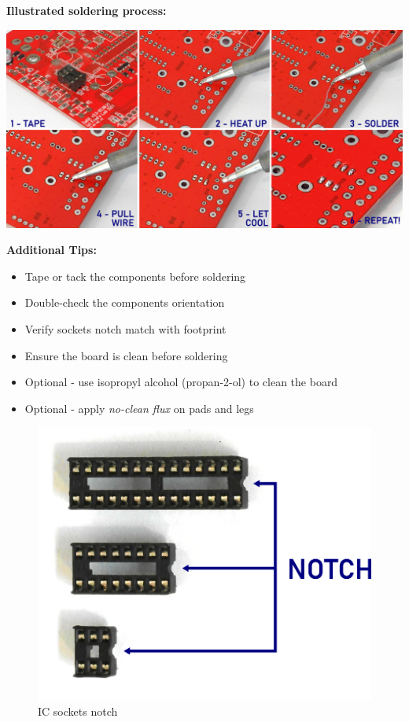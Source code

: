\documentclass{scrartcl}
\begin{document}
\pagebreak
\textbf{Illustrated soldering process:}

\begin{center}
    \includegraphics[scale=0.65]{assets/solder-strip.jpg}
\end{center}

\vspace{0.50cm}
\textbf{Additional Tips:}

\begin{itemize}
    \item Tape or tack the components before soldering
    \item Double-check the components orientation
    \item Verify sockets notch match with footprint
    \item Ensure the board is clean before soldering
    \item Optional - use isopropyl alcohol (propan-2-ol) to clean the board
    \item Optional - apply \emph{no-clean flux} on pads and legs
\end{itemize}

\vspace{0.25cm}

\begin{figure}[!ht]
    \begin{center}
        \includegraphics[scale=0.38]{assets/ic-notch.png}
        \caption{IC sockets notch}
    \end{center}
\end{figure}
\end{document}
